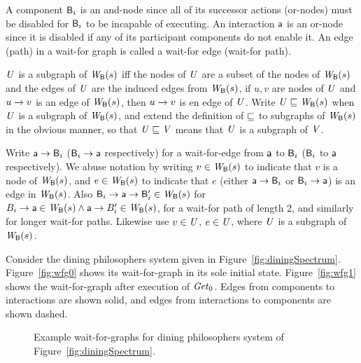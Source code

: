 A component $\mathsf{B}_i$ is an and-node since all of its successor actions (or-nodes) must be disabled for
$\mathsf{B}_i$ to be incapable of executing.  An interaction $\mathsf{a}$ is an or-node since it is disabled if
any of its participant components do not enable it.  An edge (path) in a wait-for graph is called a
wait-for edge (wait-for path). 


\begin{definition} \label{defn:wsubgraph}
$\mathit{U}$ is a subgraph of $\mathit{W}_{\mathsf{B}}({s})$ iff the nodes of $\mathit{U}$ are a subset of the nodes of $\mathit{W}_{\mathsf{B}}({s})$ and the edges of $\mathit{U}$ are the induced edges from 
$\mathit{W}_{\mathsf{B}}({s})$, \ie if $u,v$ are nodes of $\mathit{U}$ and $u \rightarrow v$ is an edge of $\mathit{W}_{\mathsf{B}}({s})$, then $u \rightarrow v$ is en edge of $\mathit{U}$.
Write $\mathit{U} \sqsubseteq \mathit{W}_{\mathsf{B}}({s})$ when $\mathit{U}$ is a subgraph of $\mathit{W}_{\mathsf{B}}({s})$, and extend the definition of $\sqsubseteq$ to subgraphs of $\mathit{W}_{\mathsf{B}}({s})$ in the obvious
manner, so that $\mathit{U} \sqsubseteq \mathit{V}$ means that $\mathit{U}$ is a subgraph of $\mathit{V}$.
\end{definition}

Write $\mathsf{a} \rightarrow \mathsf{B}_i$ ($\mathsf{B}_i \rightarrow \mathsf{a}$ respectively) for a
wait-for-edge from $\mathsf{a}$ to $\mathsf{B}_i$ ($\mathsf{B}_i$ to $\mathsf{a}$ respectively).  We abuse notation by writing
$v \in \mathit{W}_{\mathsf{B}}({s})$ to indicate that $v$ is a node of $\mathit{W}_{\mathsf{B}}({s})$, and 
$e \in \mathit{W}_{\mathsf{B}}({s})$ to indicate that $e$ (either $\mathsf{a} \rightarrow \mathsf{B}_i$ or $\mathsf{B}_i \rightarrow \mathsf{a}$) is an edge in
$\mathit{W}_{\mathsf{B}}({s})$. 
Also $\mathsf{B}_i \rightarrow \mathsf{a} \rightarrow \mathsf{B}'_i \in \mathit{W}_{\mathsf{B}}({s})$ for
$B_i \rightarrow \mathsf{a} \in \mathit{W}_{\mathsf{B}}({s}) \land \mathsf{a} \rightarrow B'_i \in \mathit{W}_{\mathsf{B}}({s})$, \ie for a wait-for path of
length 2, and similarly for longer wait-for paths.
Likewise use $v \in \mathit{U}$, $e \in \mathit{U}$, where $\mathit{U}$ is a subgraph of $\mathit{W}_{\mathsf{B}}({s})$.



Consider the dining philosophers system given in Figure~\ref{fig:diningSpectrum}.
Figure~\ref{fig:wfg0} shows its wait-for-graph in its sole initial state.  Figure~\ref{fig:wfg1}
shows the wait-for-graph after execution of $\mathit{Get}_0$.  Edges from components to interactions are
shown solid, and edges from interactions to components are shown dashed.

\begin{figure*}[ht]
  \begin{center}
       \quad
      \caption{Example wait-for-graphs for dining philosophers system of Figure~\ref{fig:diningSpectrum}.}
       \label{fig:wfg}
  \end{center}
\end{figure*}





